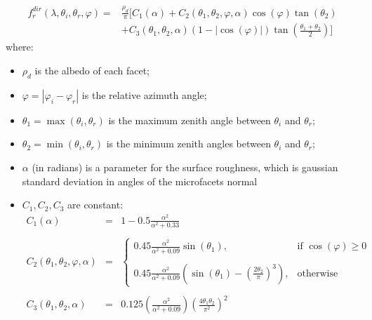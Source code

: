 \[
    \begin{array}{ll}
        f^{dir}_{r}(\lambda, \theta_i, \theta_r, \varphi) = & \frac{\rho_d}{\pi}[ C_1(\alpha) + C_2(\theta_1, \theta_2, \varphi, \alpha)\cos(\varphi) \tan(\theta_2)              \\
                                                            & + C_3(\theta_1, \theta_2, \alpha) \left(1 - |\cos(\varphi)| \right) \tan\left(\frac{\theta_1 + \theta_2}{2}\right)]
    \end{array}
\]
where:
\begin{itemize}
    \item $\rho_d$ is the albedo of each facet;
    \item $\varphi = |\varphi_i - \varphi_r|$ is the relative azimuth angle;
    \item $\theta_1 = \max(\theta_i, \theta_r)$ is the maximum zenith angle between $\theta_i$ and $\theta_r$;
    \item $\theta_2 = \min(\theta_i, \theta_r)$ is the minimum zenith angles between $\theta_i$ and $\theta_r$;
    \item $\alpha$ (in radians) is a parameter for the surface roughness, which is gaussian standard deviation in angles of the microfacets normal
    \item $C_1, C_2, C_3$ are constant:
          \[
              \begin{array}{lll}
                  C_1(\alpha)                              & = & 1  - 0.5\frac{\alpha^2}{\alpha^2 + 0.33}                                                                                                      \\ \\
                  C_2(\theta_1, \theta_2, \varphi, \alpha) & = & \begin{cases}
                                                                     0.45 \frac{\alpha^2}{\alpha^2 + 0.09}\sin(\theta_1),                                                     & \mbox{if $\cos(\varphi) \ge 0$} \\ \\
                                                                     0.45 \frac{\alpha^2}{\alpha^2 + 0.09}\left(\sin(\theta_1) - \left(\frac{2\theta_2}{\pi}\right)^3\right), & \mbox{otherwise}
                                                                 \end{cases} \\ \\
                  C_3(\theta_1, \theta_2, \alpha)          & = & 0.125 \left(\frac{\alpha^2}{\alpha^2 + 0.09}\right) \left(\frac{4\theta_1 \theta_2}{\pi^2}\right)^2
              \end{array}
          \]
\end{itemize}
